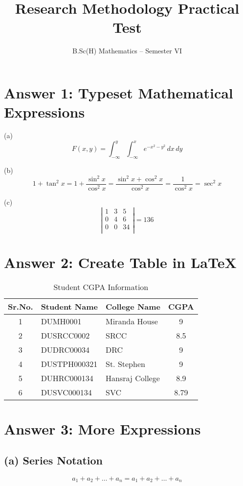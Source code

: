 \documentclass{article}
\title{Research Methodology Practical Test}
\author{B.Sc(H) Mathematics – Semester VI}
\date{}
\begin{document}
\maketitle

\section*{Answer 1: Typeset Mathematical Expressions}

(a)
\[
F(x, y) = \int_{-\infty}^{y} \int_{-\infty}^{x} e^{-x^2 - y^2} \, dx \, dy
\]

(b)
\[
1 + \tan^2x = 1 + \frac{\sin^2x}{\cos^2x} = \frac{\sin^2x + \cos^2x}{\cos^2x} = \frac{1}{\cos^2x} = \sec^2x
\]

(c)
\[
\left| \begin{array}{ccc}
1 & 3 & 5 \\
0 & 4 & 6 \\
0 & 0 & 34 \\
\end{array} \right| = 136
\]

\section*{Answer 2: Create Table in LaTeX}

\begin{table}[h!]
\centering
\begin{tabular}{|c|l|l|c|}
\hline
\textbf{Sr.No.} & \textbf{Student Name} & \textbf{College Name} & \textbf{CGPA} \\
\hline
1 & DUMH0001 & Miranda House & 9 \\
2 & DUSRCC0002 & SRCC & 8.5 \\
3 & DUDRC00034 & DRC & 9 \\
4 & DUSTPH000321 & St. Stephen & 9 \\
5 & DUHRC000134 & Hansraj College & 8.9 \\
6 & DUSVC000134 & SVC & 8.79 \\
\hline
\end{tabular}
\caption{Student CGPA Information}
\end{table}

\section*{Answer 3: More Expressions}

\subsection*{(a) Series Notation}
\[
a_1 + a_2 + \dots + a_n = a_1 + a_2 + \ldots + a_n
\]
\end{document}
